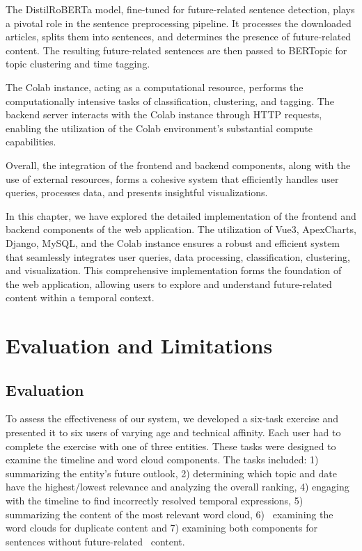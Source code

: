\documentclass[a4paper,10pt]{report} %
\begin{document}
The DistilRoBERTa model, fine-tuned for future-related sentence detection, plays a pivotal role in the sentence preprocessing pipeline. It processes the downloaded articles, splits them into sentences, and determines the presence of future-related content. The resulting future-related sentences are then passed to BERTopic for topic clustering and time tagging.

The Colab instance, acting as a computational resource, performs the computationally intensive tasks of classification, clustering, and tagging. The backend server interacts with the Colab instance through HTTP requests, enabling the utilization of the Colab environment's substantial compute capabilities.

Overall, the integration of the frontend and backend components, along with the use of external resources, forms a cohesive system that efficiently handles user queries, processes data, and presents insightful visualizations.

In this chapter, we have explored the detailed implementation of the frontend and backend components of the web application. The utilization of Vue3, ApexCharts, Django, MySQL, and the Colab instance ensures a robust and efficient system that seamlessly integrates user queries, data processing, classification, clustering, and visualization. This comprehensive implementation forms the foundation of the web application, allowing users to explore and understand future-related content within a temporal context.

\chapter{Evaluation and Limitations}

\section{Evaluation}

To assess the effectiveness of our system, we developed a six-task exercise and presented it to six users of varying age and technical affinity. Each user had to complete the exercise with one of three entities. These tasks were designed to examine the timeline and word cloud components. The tasks included: 1) summarizing the entity's future outlook, 2) determining which topic and date have the highest/lowest relevance and analyzing the overall ranking, 4) engaging with the timeline to find incorrectly resolved temporal expressions, 5) summarizing the content of the most relevant word cloud, 6)~ examining the word clouds for duplicate content and 7) examining both components for sentences without future-related~ content.
\end{document}
